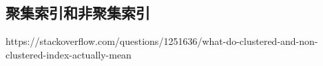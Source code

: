 \documentclass[../../../interview-questions.tex]{subfiles}
\begin{document}
\subsection{聚集索引和非聚集索引}

https://stackoverflow.com/questions/1251636/what-do-clustered-and-non-clustered-index-actually-mean
\end{document}
